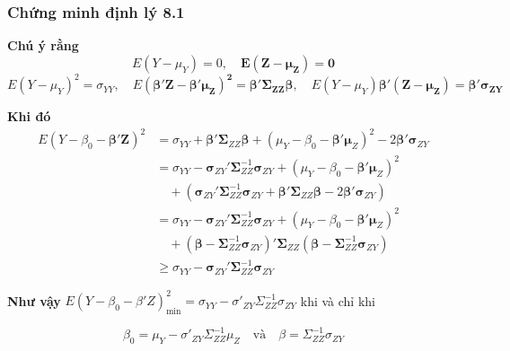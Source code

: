 \begin{frame}
\frametitle{Chứng minh định lý 8.1}
\textbf{Chú ý rằng}
\[
        E(Y - \mu_Y) = 0, \quad \boldsymbol{E(Z - \mu_Z) = 0}
\]
\[
        E(Y - \mu_Y)^2 = \sigma_{YY}, \quad E\boldsymbol{(\beta' Z - \beta' \mu_Z)^2} = \boldsymbol{\beta' \Sigma_{ZZ} \beta}, \quad E(Y - \mu_Y)\boldsymbol{\beta' (Z - \mu_Z)} = \boldsymbol{\beta' \sigma_{ZY}}
\]

        \textbf{Khi đó}
\[
\begin{aligned}
E(Y - \beta_0 - \mathbf{\beta}' \mathbf{Z})^2 
&= \sigma_{YY} + \mathbf{\beta}' \boldsymbol{\Sigma}_{ZZ} \mathbf{\beta} 
+ (\mu_Y - \beta_0 - \mathbf{\beta}' \boldsymbol{\mu}_Z)^2 
- 2 \mathbf{\beta}' \boldsymbol{\sigma}_{ZY} \\[6pt]
&= \sigma_{YY} - \boldsymbol{\sigma}_{ZY}' 
\boldsymbol{\Sigma}_{ZZ}^{-1} \boldsymbol{\sigma}_{ZY} 
+ (\mu_Y - \beta_0 - \mathbf{\beta}' \boldsymbol{\mu}_Z)^2 \\ 
&\quad + \left(\boldsymbol{\sigma}_{ZY}' \boldsymbol{\Sigma}_{ZZ}^{-1} 
\boldsymbol{\sigma}_{ZY} + \mathbf{\beta}' \boldsymbol{\Sigma}_{ZZ} \mathbf{\beta} 
- 2 \mathbf{\beta}' \boldsymbol{\sigma}_{ZY}\right) \\[6pt]
&= \sigma_{YY} - \boldsymbol{\sigma}_{ZY}' 
\boldsymbol{\Sigma}_{ZZ}^{-1} \boldsymbol{\sigma}_{ZY} 
+ (\mu_Y - \beta_0 - \mathbf{\beta}' \boldsymbol{\mu}_Z)^2 
\\
&\quad + (\mathbf{\beta} - \boldsymbol{\Sigma}_{ZZ}^{-1} 
\boldsymbol{\sigma}_{ZY})' \boldsymbol{\Sigma}_{ZZ} 
(\mathbf{\beta} - \boldsymbol{\Sigma}_{ZZ}^{-1} \boldsymbol{\sigma}_{ZY}) \\[6pt]
&\geq \sigma_{YY} - \boldsymbol{\sigma}_{ZY}' 
\boldsymbol{\Sigma}_{ZZ}^{-1} \boldsymbol{\sigma}_{ZY}
\end{aligned}
\]


        \textbf{Như vậy} \(E(Y - \beta_0 - \beta' Z)^2_{\min} = \sigma_{YY} - \sigma'_{ZY} \Sigma_{ZZ}^{-1} \sigma_{ZY}\) khi và chỉ khi

        \[
        \beta_0 = \mu_Y - \sigma'_{ZY} \Sigma_{ZZ}^{-1} \mu_Z \quad \text{và} \quad \beta = \Sigma_{ZZ}^{-1} \sigma_{ZY}
        \]

\end{frame}

